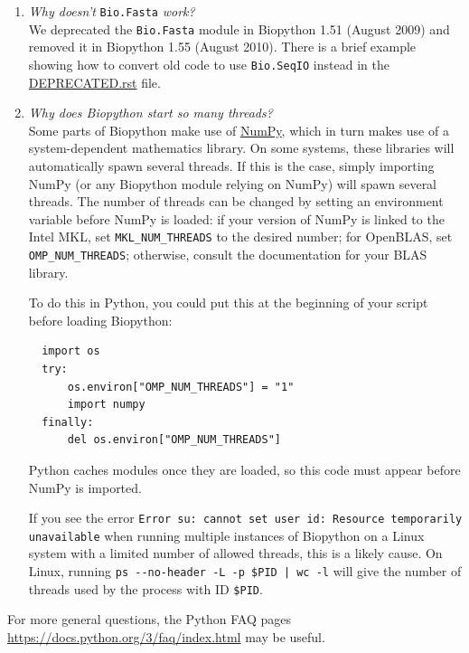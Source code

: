 \begin{enumerate}
  \item \emph{Why doesn't} \verb|Bio.Fasta| \emph{work?} \\
  We deprecated the \verb|Bio.Fasta| module in Biopython 1.51 (August 2009) and removed it in Biopython 1.55 (August 2010). There is a brief example showing how to convert old code to use \verb|Bio.SeqIO| instead in the \href{https://github.com/biopython/biopython/blob/master/DEPRECATED.rst}{DEPRECATED.rst} file.

  \item \emph{Why does Biopython start so many threads?} \\
  Some parts of Biopython make use of \href{http://www.numpy.org}{NumPy}, which in turn makes use of a system-dependent mathematics library. On some systems, these libraries will automatically spawn several threads. If this is the case, simply importing NumPy (or any Biopython module relying on NumPy) will spawn several threads. The number of threads can be changed by setting an environment variable before NumPy is loaded: if your version of NumPy is linked to the Intel MKL, set \verb|MKL_NUM_THREADS| to the desired number; for OpenBLAS, set \verb|OMP_NUM_THREADS|; otherwise, consult the documentation for your BLAS library.

  To do this in Python, you could put this at the beginning of your script before loading Biopython:
  \begin{verbatim}
  import os
  try:
      os.environ["OMP_NUM_THREADS"] = "1"
      import numpy
  finally:
      del os.environ["OMP_NUM_THREADS"]
  \end{verbatim}
  Python caches modules once they are loaded, so this code must appear before NumPy is imported.

  If you see the error \verb|Error su: cannot set user id: Resource temporarily unavailable| when running multiple instances of Biopython on a Linux system with a limited number of allowed threads, this is a likely cause. On Linux, running \verb!ps --no-header -L -p $PID | wc -l! will give the number of threads used by the process with ID \verb|$PID|.


\end{enumerate}

\noindent For more general questions, the Python FAQ pages \url{https://docs.python.org/3/faq/index.html} may be useful.
